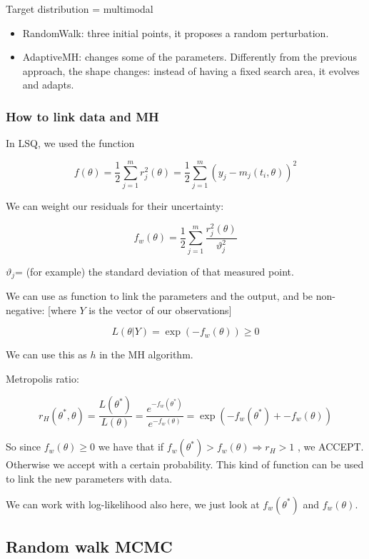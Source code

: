 Target distribution = multimodal

\begin{itemize}
\tightlist
\item
  RandomWalk: three initial points, it proposes a random perturbation.
\item
  AdaptiveMH: changes some of the parameters. Differently from the
  previous approach, the shape changes: instead of having a fixed search
  area, it evolves and adapts.
\end{itemize}

\hypertarget{how-to-link-data-and-mh}{%
\subsubsection{How to link data and MH}\label{how-to-link-data-and-mh}}

In LSQ, we used the function

$$
f(\theta)=\frac{1}{2}\sum^m_{j=1}r^2_j(\theta)=\frac{1}{2}\sum^m_{j=1}(y_j-m_j(t_i,\theta))^2
$$

We can weight our residuals for their uncertainty:

$$
f_w(\theta)=\frac{1}{2}\sum^m_{j=1} \frac{r^2_j(\theta)}{\vartheta_j^2}
$$

$\vartheta_j$= (for example) the standard deviation of that measured
point.

We can use as function to link the parameters and the output, and be
non-negative: {[}where $Y$ is the vector of our observations{]}

$$
L(\theta|Y)=\exp(-f_w(\theta)) \geq 0
$$

We can use this as $h$ in the MH algorithm.

Metropolis ratio:

$$
r_H(\theta^*,\theta)=\frac{L(\theta^*)}{L(\theta)}=\frac{e^{-f_w(\theta^*)}}{e^{-f_w(\theta)}}=\exp(-f_w(\theta^*)+-f_w(\theta))
$$

So since $f_w(\theta)\geq0$ we have that if
$f_w(\theta^*) > f_w(\theta) \Rightarrow r_H>1$ , we ACCEPT. Otherwise
we accept with a certain probability. This kind of function can be used
to link the new parameters with data.

We can work with log-likelihood also here, we just look at
$f_w(\theta^*)$ and $f_w(\theta)$.

\hypertarget{random-walk-mcmc}{%
\subsection{Random walk MCMC}\label{random-walk-mcmc}}

